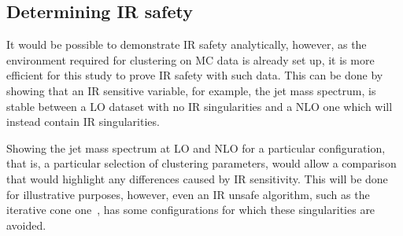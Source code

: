 
\subsection{Determining IR safety}\label{sec:IRmethod}
    It would be possible to demonstrate IR safety analytically, however,
    as the environment required for clustering on MC data is already set up,
    it is more efficient for this study to prove IR safety with such data.
    This can be done by showing that an IR sensitive variable, for example, the jet mass spectrum,
    is stable between a LO dataset with no IR singularities and a NLO
    one which will instead contain IR singularities.

    Showing the jet mass spectrum at LO and NLO for a particular configuration,
    that is, a particular selection of clustering parameters,
    would allow a comparison that would highlight any differences caused by IR sensitivity.
    This will be done for illustrative purposes,
    however, even an IR unsafe algorithm, such as the iterative cone one~\cite{cacciari_antikt2018},
     has some configurations for which these singularities are avoided.


